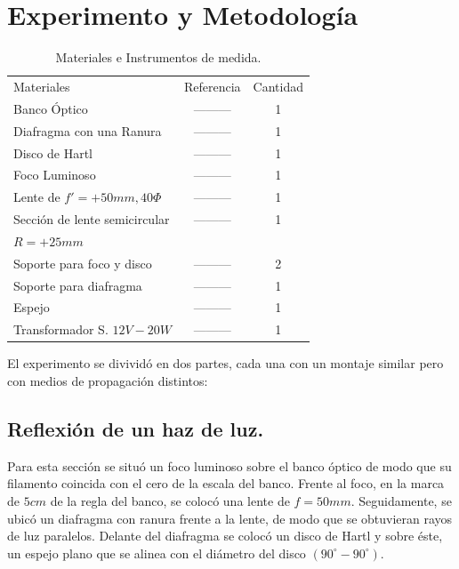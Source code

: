 \documentclass[
aps,
reprint,
amsmath, amssymb,
superscriptaddress,
]{revtex4-2}
\begin{document}
\section{Experimento y Metodología}
\begin{table}
	\caption{\label{tab:materiales}Materiales e Instrumentos de medida.}
	\begin{ruledtabular}
		\begin{tabular}{lcc}
            \textrm{Materiales} & \textrm{Referencia} & \textrm{Cantidad}\\
			\colrule
            Banco Óptico                & --------- & 1\\
			Diafragma con una Ranura    & --------- & 1\\
            Disco de Hartl              & --------- & 1\\
            Foco Luminoso               & --------- & 1\\
            Lente de $f'=+50mm, 40\Phi$ & --------- & 1\\
            Sección de lente semicircular & --------- & 1\\
            $R=+25mm$      & &\\
            Soporte para foco y disco   & --------- & 2\\
            Soporte para diafragma      & --------- & 1\\
            Espejo                      & --------- & 1\\
            Transformador S. $12V-20W$  & --------- & 1\\
	\end{tabular}
	\end{ruledtabular}
\end{table}

El experimento se divividó en dos partes, cada una con un montaje similar pero con medios de propagación distintos:

\subsection{Reflexión de un haz de luz.}
Para esta sección se situó un foco luminoso sobre el banco óptico de modo que su filamento coincida con el cero de la escala del banco. Frente al foco, en la marca de $5 cm$ de la regla del banco, se colocó una lente de $f=50mm$. Seguidamente, se ubicó un diafragma con ranura frente a la lente, de modo que se obtuvieran rayos de luz paralelos. Delante del diafragma se colocó un disco de Hartl y sobre éste, un espejo plano que se alinea con el diámetro del disco $(90^{\circ}-90^{\circ})$.
\end{document}
